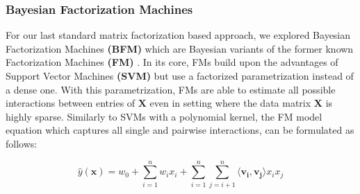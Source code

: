 \documentclass[10pt,conference,compsocconf]{IEEEtran}
\begin{document}
    \subsubsection{Bayesian Factorization Machines}
    For our last standard matrix factorization based approach, we explored Bayesian Factorization Machines \textbf{(BFM)} which are Bayesian variants of the former known Factorization Machines \textbf{(FM)} \cite{rendle_factorization_2010}.
    In its core, FMs build upon the advantages of Support Vector Machines \textbf{(SVM)} but use a factorized parametrization instead of a dense one.
    With this parametrization, FMs are able to estimate all possible interactions between entries of $\mathbf{X}$ even in setting where the data matrix $\mathbf{X}$ is highly sparse.
    Similarly to SVMs with a polynomial kernel, the FM model equation which captures all single and pairwise interactions, can be formulated as follows:

    $$\hat{y}(\mathbf{x})=w_0+\sum^n_{i=1}w_ix_i + \sum^n_{i=1}\sum^n_{j=i+1}\langle \mathbf{v_i},\mathbf{v_j} \rangle x_ix_j$$
\end{document}
